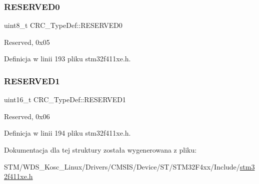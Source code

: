 \subsubsection{\texorpdfstring{R\+E\+S\+E\+R\+V\+E\+D0}{RESERVED0}}
{\footnotesize\ttfamily uint8\+\_\+t C\+R\+C\+\_\+\+Type\+Def\+::\+R\+E\+S\+E\+R\+V\+E\+D0}

Reserved, 0x05 

Definicja w linii 193 pliku stm32f411xe.\+h.

\mbox{\label{struct_c_r_c___type_def_a8b205c6e25b1808ac016db2356b3021d}} 
\subsubsection{\texorpdfstring{R\+E\+S\+E\+R\+V\+E\+D1}{RESERVED1}}
{\footnotesize\ttfamily uint16\+\_\+t C\+R\+C\+\_\+\+Type\+Def\+::\+R\+E\+S\+E\+R\+V\+E\+D1}

Reserved, 0x06 

Definicja w linii 194 pliku stm32f411xe.\+h.



Dokumentacja dla tej struktury została wygenerowana z pliku\+:\begin{DoxyCompactItemize}
\item 
S\+T\+M/\+W\+D\+S\+\_\+\+Kosc\+\_\+\+Linux/\+Drivers/\+C\+M\+S\+I\+S/\+Device/\+S\+T/\+S\+T\+M32\+F4xx/\+Include/\hyperlink{stm32f411xe_8h}{stm32f411xe.\+h}\end{DoxyCompactItemize}
